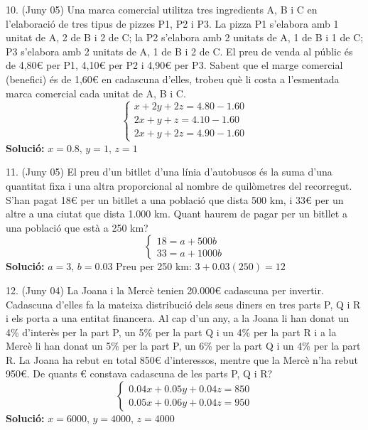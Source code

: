 \documentclass[12pt]{article}
\begin{document}
\begin{exercici}
10. (Juny 05) Una marca comercial utilitza tres ingredients A, B i C en l’elaboració de tres tipus de pizzes P1, P2 i P3. La pizza P1 s’elabora amb 1 unitat de A, 2 de B i 2 de C; la P2 s’elabora amb 2 unitats de A, 1 de B i 1 de C; P3 s’elabora amb 2 unitats de A, 1 de B i 2 de C. El preu de venda al públic és de 4,80€ per P1, 4,10€ per P2 i 4,90€ per P3. Sabent que el marge comercial (benefici) és de 1,60€ en cadascuna d’elles, trobeu què li costa a l’esmentada marca comercial cada unitat de A, B i C.
\[
\begin{cases}
x + 2y + 2z = 4.80 - 1.60 \\
2x + y + z = 4.10 - 1.60 \\
2x + y + 2z = 4.90 - 1.60
\end{cases}
\]
\textbf{Solució:} \( x = 0.8, \, y = 1, \, z = 1 \)
\end{exercici}

\begin{exercici}
11. (Juny 05) El preu d’un bitllet d’una línia d’autobusos és la suma d’una quantitat fixa i una altra proporcional al nombre de quilòmetres del recorregut. S’han pagat 18€ per un bitllet a una població que dista 500 km, i 33€ per un altre a una ciutat que dista 1.000 km. Quant haurem de pagar per un bitllet a una població que està a 250 km?
\[
\begin{cases}
18 = a + 500b \\
33 = a + 1000b
\end{cases}
\]
\textbf{Solució:} \( a = 3, \, b = 0.03 \) \quad Preu per 250 km: \( 3 + 0.03(250) = 12 \)
\end{exercici}

\begin{exercici}
12. (Juny 04) La Joana i la Mercè tenien 20.000€ cadascuna per invertir. Cadascuna d’elles fa la mateixa distribució dels seus diners en tres parts P, Q i R i els porta a una entitat financera. Al cap d’un any, a la Joana li han donat un 4\% d’interès per la part P, un 5\% per la part Q i un 4\% per la part R i a la Mercè li han donat un 5\% per la part P, un 6\% per la part Q i un 4\% per la part R. La Joana ha rebut en total 850€ d’interessos, mentre que la Mercè n’ha rebut 950€. De quants € constava cadascuna de les parts P, Q i R?
\[
\begin{cases}
0.04x + 0.05y + 0.04z = 850 \\
0.05x + 0.06y + 0.04z = 950
\end{cases}
\]
\textbf{Solució:} \( x = 6000, \, y = 4000, \, z = 4000 \)
\end{exercici}
\end{document}
